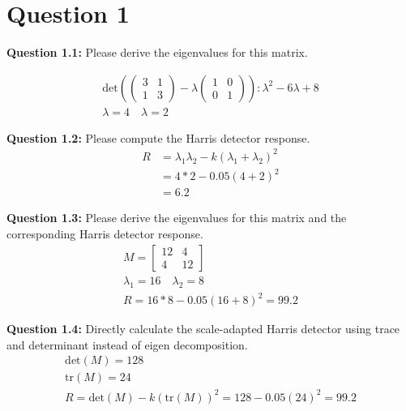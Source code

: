\documentclass[12pt]{article}
\begin{document}
\maketitle

\section*{Question 1}

\textbf{Question 1.1:} Please derive the eigenvalues for this matrix.

\begin{gather*}
    \text{det} \left( \begin{pmatrix}
        3 & 1 \\ 1 & 3
    \end{pmatrix} - \lambda \begin{pmatrix}
        1 & 0 \\ 0 & 1
    \end{pmatrix}\right): \lambda^2 - 6\lambda + 8 \\ 
    \lambda = 4 \quad \lambda = 2
\end{gather*}

\textbf{Question 1.2:} Please compute the Harris detector response.
\begin{align*}
    R &=\lambda_1 \lambda_2 - k(\lambda_1 + \lambda_2)^2 \\
    &= 4*2 - 0.05(4 + 2)^2 \\ 
    &= 6.2
\end{align*}

\textbf{Question 1.3:} Please derive the eigenvalues for this matrix and the corresponding Harris
detector response. 
\begin{gather*}
    M = \begin{bmatrix}
        12 & 4 \\ 4 & 12
    \end{bmatrix} \\ 
    \lambda_1 = 16 \quad \lambda_2 = 8 \\ 
    R = 16*8 - 0.05(16 + 8)^2 = 99.2
\end{gather*}

\textbf{Question 1.4:} Directly calculate the scale-adapted Harris detector using trace and determinant instead of eigen decomposition. 
\begin{gather*}
    \text{det}(M) = 128 \\ 
    \text{tr}(M) = 24 \\ 
    R = \text{det}(M) - k(\text{tr}(M))^2 = 128 - 0.05(24)^2 = 99.2
\end{gather*}
\end{document}
